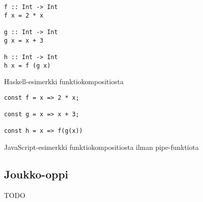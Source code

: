 \begin{code}
	\begin{verbatim}
f :: Int -> Int
f x = 2 * x

g :: Int -> Int
g x = x + 3

h :: Int -> Int
h x = f (g x)
\end{verbatim}
	\caption{Haskell-esimerkki funktiokompositiosta}
	\label{code:haskell_composition}
\end{code}
\bigskip
\begin{code}
	\begin{verbatim}
const f = x => 2 * x;

const g = x => x + 3;

const h = x => f(g(x))
\end{verbatim}
	\caption{JavaScript-esimerkki funktiokompositiosta ilman pipe-funktiota}
	\label{code:javascript_composition}
\end{code}


\subsection{Joukko-oppi}

TODO

